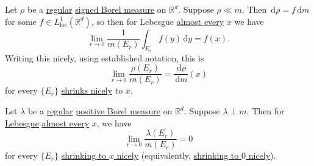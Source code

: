 \begin{corollary}
	Let \(\rho\) be a \hyperref[def:regular]{regular} \hyperref[def:signed-measure]{signed Borel measure} on \(\mathbb{R}^d\). Suppose \(\rho \ll m\). Then
	\(\,\mathrm{d}\rho = f\,\mathrm{d}m\) for some \(f \in L^1_{\mathrm{loc}}(\mathbb{R}^d)\), so then for Lebesgue \hyperref[def:mu-almost-everywhere]{almost every} \(x\)
	we have
	\[
		\lim_{r \to 0} \frac{1}{m(E_r)} \int_{E_r} f(y) \,\mathrm{d}y = f(x).
	\]
	Writing this nicely, using established notation, this is
	\[
		\lim_{r \to 0} \frac{\rho(E_r)}{m(E_r)} = \frac{\,\mathrm{d}\rho}{\,\mathrm{d}m}(x)
	\]
	for every \(\{E_r\}\) \hyperref[def:shrink-nicely]{shrinks nicely} to \(x\).
\end{corollary}

\begin{proposition}\label{prop:lec-32}
	Let \(\lambda\) be a \hyperref[def:regular]{regular} \hyperref[def:signed-measure]{positive Borel measure} on \(\mathbb{R}^d\). Suppose \(\lambda \perp m\).
	Then for \hyperref[def:Lebesgue-measure]{Lebesgue} \hyperref[def:mu-almost-everywhere]{almost every} \(x\), we have
	\[
		\lim_{r \to 0} \frac{\lambda(E_r)}{m(E_r)} = 0
	\]
	for every \(\{E_r\}\) \hyperref[def:shrink-nicely]{shrinking to \(x\) nicely} (equivalently, \hyperref[def:shrink-nicely]{shrinking to \(0\) nicely}).
\end{proposition}

